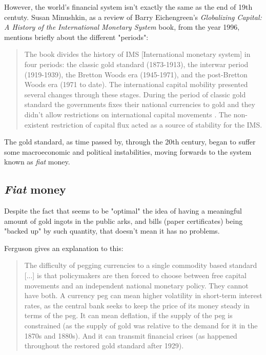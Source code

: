 \documentclass[12pt,a4paper,twoside]{book}
\begin{document}
However, the world's financial system isn't exactly the same as the end of 19th centuty. Susan Minushkin, as a review of Barry Eichengreen's \textit{Globalizing Capital: A History of the International Monetary System} book, from the year 1996, mentions briefly about the different "periods":

\begin{quotation}
The book divides the history of IMS [International monetary system] in four periods: the classic gold standard (1873-1913), the interwar period (1919-1939), the Bretton Woods era (1945-1971), and the post-Bretton Woods era (1971 to date). The international capital mobility presented several changes through these stages. During the period of classic gold standard the governments fixes their national currencies to gold and they didn't allow restrictions on international capital movements . The non-existent restriction of capital flux acted as a source of stability for the IMS. \cite[p. 275]{susan-capital}
\end{quotation}

The gold standard, as time passed by, through the 20th century, began to suffer some macroeconomic and political instabilities, moving forwards to the system known as \textit{fiat} money.

\subsection{\textit{Fiat} money}
Despite the fact that seems to be "optimal" the idea of having a meaningful amount of gold ingots in the public arks, and bills (paper certificates) being "backed up" by such quantity, that doesn't mean it has no problems.

Ferguson gives an explanation to this:

\begin{quotation}
The difficulty of pegging currencies to a single commodity based standard [...] is that policymakers are then forced to choose between free capi­tal movements and an independent national monetary policy. They cannot have both. A currency peg can mean higher volatility in short-term interest rates, as the central bank seeks to keep the price of its money steady in terms of the peg. It can mean deflation, if the supply of the peg is constrained (as the supply of gold was relative to the demand for it in the 1870s and 1880s). And it can transmit financial crises (as happened throughout the restored gold standard after 1929). \cite[pp. 58]{ferguson:ascent-money}
\end{quotation}
\end{document}
